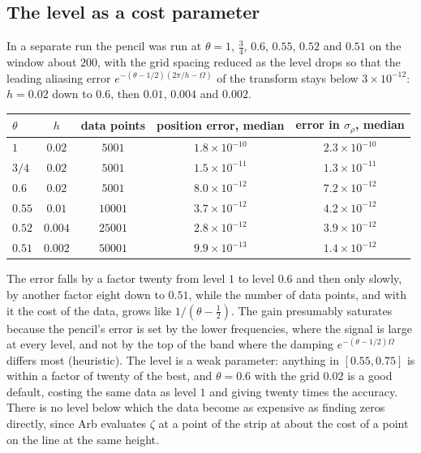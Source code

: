 \subsection{The level as a cost parameter}

In a separate run the pencil was run at $\theta=1$, $\tfrac34$, $0.6$, $0.55$, $0.52$ and $0.51$ on the window about $200$, with the grid spacing reduced as the level drops so that the leading aliasing error $e^{-(\theta-1/2)(2\pi/h-\Omega)}$ of the transform stays below $3\times10^{-12}$: $h=0.02$ down to $0.6$, then $0.01$, $0.004$ and $0.002$.

\begin{center}
\small
\begin{tabular}{lcccc}
\toprule
$\theta$ & $h$ & data points & position error, median & error in $\sigma_\rho$, median\\
\midrule
$1$ & $0.02$ & $5001$ & $1.8\times10^{-10}$ & $2.3\times10^{-10}$\\
$3/4$ & $0.02$ & $5001$ & $1.5\times10^{-11}$ & $1.3\times10^{-11}$\\
$0.6$ & $0.02$ & $5001$ & $8.0\times10^{-12}$ & $7.2\times10^{-12}$\\
$0.55$ & $0.01$ & $10001$ & $3.7\times10^{-12}$ & $4.2\times10^{-12}$\\
$0.52$ & $0.004$ & $25001$ & $2.8\times10^{-12}$ & $3.9\times10^{-12}$\\
$0.51$ & $0.002$ & $50001$ & $9.9\times10^{-13}$ & $1.4\times10^{-12}$\\
\bottomrule
\end{tabular}
\end{center}

\noindent The error falls by a factor twenty from level $1$ to level $0.6$ and then only slowly, by another factor eight down to $0.51$, while the number of data points, and with it the cost of the data, grows like $1/(\theta-\tfrac12)$. The gain presumably saturates because the pencil's error is set by the lower frequencies, where the signal is large at every level, and not by the top of the band where the damping $e^{-(\theta-1/2)\Omega}$ differs most (heuristic). The level is a weak parameter: anything in $[0.55,0.75]$ is within a factor of twenty of the best, and $\theta=0.6$ with the grid $0.02$ is a good default, costing the same data as level $1$ and giving twenty times the accuracy. There is no level below which the data become as expensive as finding zeros directly, since Arb evaluates $\zeta$ at a point of the strip at about the cost of a point on the line at the same height.

